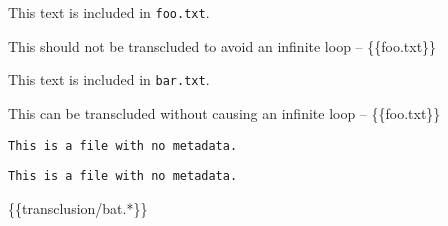 
\def\mytitle{Transclusion}


This text is included in \texttt{foo.txt}.

This should not be transcluded to avoid an infinite loop -- \{\{foo.txt\}\}

This text is included in \texttt{bar.txt}.

This can be transcluded without causing an infinite loop -- \{\{foo.txt\}\}

\begin{verbatim}
This is a file with no metadata.
\end{verbatim}

\begin{verbatim}
This is a file with no metadata.
\end{verbatim}

\{\{transclusion\slash bat.*\}\}



